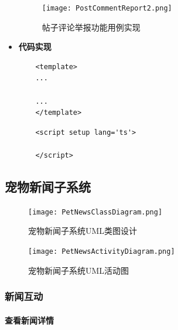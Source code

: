 \begin{itemize}
	\begin{figure}[H]
		\centering
		\texttt{[image: PostCommentReport2.png]}
		\caption{帖子评论举报功能用例实现}
		\label{fig:post-report.png}
	\end{figure}

	\item \textbf{代码实现}
	\begin{verbatim}
	<template>
	...
	
	...
	</template>
	\end{verbatim}
	
	\begin{verbatim}
	<script setup lang='ts'>
	
	</script>
	\end{verbatim}
\end{itemize}

\subsection{宠物新闻子系统}

\begin{figure}[H]
	\centering
	\texttt{[image: PetNewsClassDiagram.png]}
	\caption{宠物新闻子系统UML类图设计}
\end{figure}

\begin{figure}[H]
	\centering
	\texttt{[image: PetNewsActivityDiagram.png]} 
	\caption{宠物新闻子系统UML活动图}
	\label{fig:PetNewsActivityDiagram}
\end{figure}

\subsubsection{新闻互动}

\paragraph{查看新闻详情}

